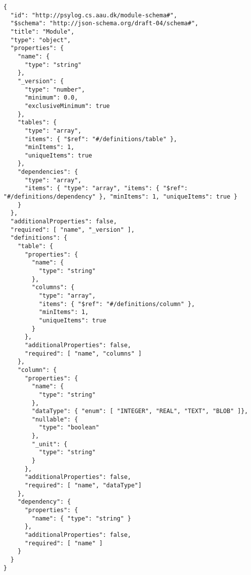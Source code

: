 \begin{lstlisting}
{
  "id": "http://psylog.cs.aau.dk/module-schema#",
  "$schema": "http://json-schema.org/draft-04/schema#",
  "title": "Module",
  "type": "object",
  "properties": {
    "name": {
      "type": "string"
    },
    "_version": {
      "type": "number",
      "minimum": 0.0,
      "exclusiveMinimum": true
    },
    "tables": {
      "type": "array",
      "items": { "$ref": "#/definitions/table" },
      "minItems": 1,
      "uniqueItems": true
    },
    "dependencies": {
      "type": "array",
      "items": { "type": "array", "items": { "$ref": "#/definitions/dependency" }, "minItems": 1, "uniqueItems": true }
    }
  },
  "additionalProperties": false,
  "required": [ "name", "_version" ],
  "definitions": {
    "table": {
      "properties": {
        "name": {
          "type": "string"
        },
        "columns": {
          "type": "array",
          "items": { "$ref": "#/definitions/column" },
          "minItems": 1,
          "uniqueItems": true
        }
      },
      "additionalProperties": false,
      "required": [ "name", "columns" ]
    },
    "column": {
      "properties": {
        "name": {
          "type": "string"
        },
        "dataType": { "enum": [ "INTEGER", "REAL", "TEXT", "BLOB" ]},
        "nullable": {
          "type": "boolean"
        },
        "_unit": {
          "type": "string"
        }
      },
      "additionalProperties": false,
      "required": [ "name", "dataType"]
    },
    "dependency": {
      "properties": {
        "name": { "type": "string" }
      },
      "additionalProperties": false,
      "required": [ "name" ]
    }
  }
}
\end{lstlisting}